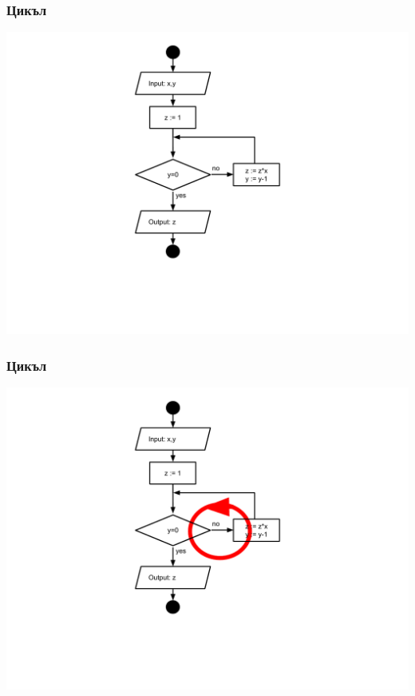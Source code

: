 \documentclass{beamer}
\begin{document}
\begin{frame}[fragile]
\frametitle{Цикъл}

\hspace*{-30pt}
\includegraphics[width=14cm]{images/fc_cycle} 

\end{frame}


\begin{frame}[fragile]
\frametitle{Цикъл}

\hspace*{-30pt}
\includegraphics[width=14cm]{images/fc_cycle_arrows} 

\end{frame}
\end{document}
